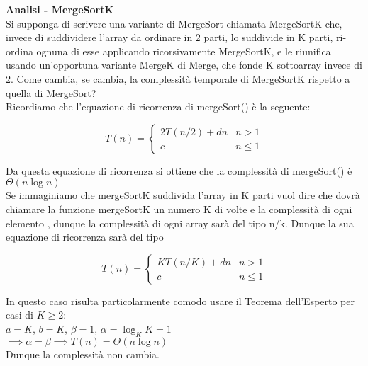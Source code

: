 \documentclass[../cheatSheetAlgoritmi.tex]{subfiles}
\begin{document}
\bigskip
\textbf{Analisi - MergeSortK}\\
Si supponga di scrivere una variante di MergeSort chiamata MergeSortK che, invece di suddividere l’array da ordinare in 2 parti, lo suddivide in K parti, ri-ordina ognuna di esse applicando ricorsivamente MergeSortK, e le riunifica usando un’opportuna variante MergeK di Merge, che fonde K sottoarray invece di 2. Come cambia, se cambia, la complessità temporale di MergeSortK rispetto a quella di MergeSort?\\
Ricordiamo che l'equazione di ricorrenza di mergeSort() è la seguente:
\begin{center}
	\begin{equation*}
  		T(n)=\begin{cases}
			2T(n/2) +  dn & \text{$n > 1$}\\
			c & \text{$n \leq 1$}	
  		\end{cases}
	\end{equation*}
\end{center}
Da questa equazione di ricorrenza si ottiene che la complessità di mergeSort() è $\Theta(n\log{n})$\\
Se immaginiamo che mergeSortK suddivida l'array in K parti vuol dire che dovrà chiamare la funzione mergeSortK un numero K di volte e la complessità di ogni elemento , dunque la complessità di ogni array sarà del tipo n/k. Dunque la sua equazione di ricorrenza sarà del tipo
\begin{center}
	\begin{equation*}
  		T(n)=\begin{cases}
			KT(n/K) +  dn & \text{$n > 1$}\\
			c & \text{$n \leq 1$}	
  		\end{cases}
	\end{equation*}
\end{center}
In questo caso risulta particolarmente comodo usare il Teorema dell'Esperto per casi di $K \geq 2$:\\
$a = K$, $b = K$, $\beta = 1$, $\alpha = \log_{K}{K} = 1$\\
$\implies \alpha = \beta \implies T(n) = \Theta(n\log{n})$\\
Dunque la complessità non cambia.

\newpage
\end{document}
